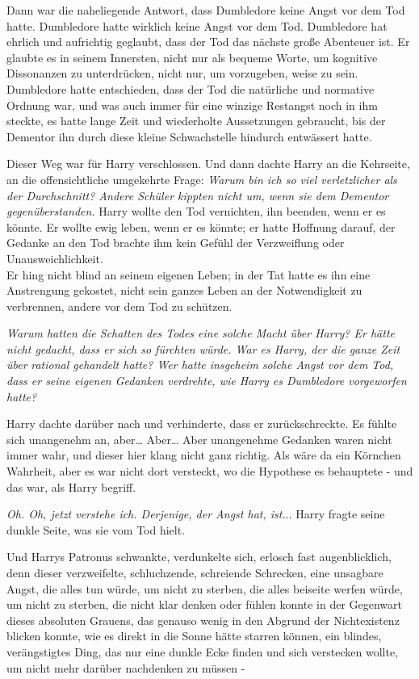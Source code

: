 {Dann war die naheliegende Antwort, dass Dumbledore keine Angst vor dem Tod hatte. Dumbledore hatte wirklich keine Angst vor dem Tod. Dumbledore hat ehrlich und aufrichtig geglaubt, dass der Tod das nächste große Abenteuer ist. Er glaubte es in seinem Innersten, nicht nur als bequeme Worte, um kognitive Dissonanzen zu unterdrücken, nicht nur, um vorzugeben, weise zu sein. Dumbledore hatte entschieden, dass der Tod die natürliche und normative Ordnung war, und was auch immer für eine winzige Restangst noch in ihm steckte, es hatte lange Zeit und wiederholte Aussetzungen gebraucht, bis der Dementor ihn durch diese kleine Schwachstelle hindurch entwässert hatte.

Dieser Weg war für Harry verschlossen. Und dann dachte Harry an die Kehrseite, an die offensichtliche umgekehrte Frage: \emph{Warum bin ich so viel verletzlicher als der Durchschnitt? Andere Schüler kippten nicht um, wenn sie dem Dementor gegenüberstanden.} Harry wollte den Tod vernichten, ihn beenden, wenn er es könnte. Er wollte ewig leben, wenn er es könnte; er hatte Hoffnung darauf, der Gedanke an den Tod brachte ihm kein Gefühl der Verzweiflung oder Unausweichlichkeit.\\ Er hing nicht blind an seinem eigenen Leben; in der Tat hatte es ihn eine Anstrengung gekostet, nicht sein ganzes Leben an der Notwendigkeit zu verbrennen, andere vor dem Tod zu schützen.

\emph{Warum hatten die Schatten des Todes eine solche Macht über Harry? Er hätte nicht gedacht, dass er sich so fürchten würde. War es Harry, der die ganze Zeit über} \emph{rational gehandelt hatte? Wer hatte insgeheim solche Angst vor dem Tod, dass er seine eigenen Gedanken verdrehte, wie Harry es Dumbledore vorgeworfen hatte?}

Harry dachte darüber nach und verhinderte, dass er zurückschreckte. Es fühlte sich unangenehm an, aber… Aber… Aber unangenehme Gedanken waren nicht immer wahr, und dieser hier klang nicht ganz richtig. Als wäre da ein Körnchen Wahrheit, aber es war nicht dort versteckt, wo die Hypothese es behauptete - und das war, als Harry begriff.

\emph{Oh. Oh, jetzt verstehe ich. Derjenige, der Angst hat, ist.}.. Harry fragte seine dunkle Seite, was sie vom Tod hielt.

Und Harrys Patronus schwankte, verdunkelte sich, erlosch fast augenblicklich, denn dieser verzweifelte, schluchzende, schreiende Schrecken, eine unsagbare Angst, die alles tun würde, um nicht zu sterben, die alles beiseite werfen würde, um nicht zu sterben, die nicht klar denken oder fühlen konnte in der Gegenwart dieses absoluten Grauens, das genauso wenig in den Abgrund der Nichtexistenz blicken konnte, wie es direkt in die Sonne hätte starren können, ein blindes, verängstigtes Ding, das nur eine dunkle Ecke finden und sich verstecken wollte, um nicht mehr darüber nachdenken zu müssen -

}
